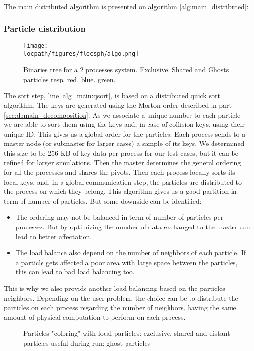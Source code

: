 The main distributed algorithm is presented on algorithm \ref{alg:main_distributed}:

\subsubsection{Particle distribution}

\begin{figure*}
\centering
\texttt{[image: \\locpath/figures/flecsph/algo.png]}
\caption{Binaries tree for a 2 processes system. Exclusive, Shared and Ghosts particles resp. red, blue, green.}
\label{fig:big_tree}
\end{figure*}

The sort step, line \ref{alg_main:qsort}, is based on a distributed quick sort algorithm. 
The keys are generated using the Morton order described in part \ref{sec:domain_decomposition}. 
As we associate a unique number to each particle we are able to sort them using the keys and, in case of collision keys, using their unique ID. 
This gives us a global order for the particles. 
Each process sends to a master node (or submaster for larger cases) a sample of its keys. 
We determined this size to be 256 KB of key data per process for our test cases, but it can be refined for larger simulations. 
Then the master determines the general ordering for all the processes and shares the pivots. 
Then each process locally sorts its local keys, and, in a global communication step, the particles are distributed to the process on which they belong. 
This algorithm gives us a good partition in term of number of particles. 
But some downside can be identified:
\begin{itemize}
	\item The ordering may not be balanced in term of number of particles per processes. But by optimizing the number of data exchanged to the master can lead to better affectation. 
	\item The load balance also depend on the number of neighbors of each particle. If a particle gets affected a poor area with large space between the particles, this can lead to bad load balancing too. 
\end{itemize}
This is why we also provide another load balancing based on the particles neighbors. 
Depending on the user problem, the choice can be to distribute the particles on each process regarding the number of neighbors, having the same amount of physical computation to perform on each process. 

\begin{figure}[t!]
\centering

\caption{Particles "coloring" with local particles: exclusive, shared and distant particles useful during run: ghost particles}
\label{fig:coloring_particles}
\end{figure}

